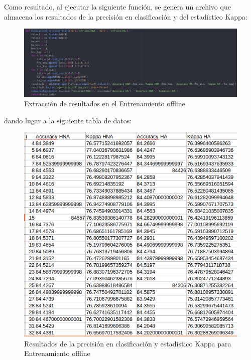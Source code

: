 Como resultado, al ejecutar la siguiente función, se genera un archivo que almacena los resultados de la precisión en clasificación y del estadístico Kappa:

\begin{figure}[H] %
	\centering
	\includegraphics[scale=0.4]{off-ev.png}  %
	\caption{Extracción de resultados en el Entrenamiento offline} 
	\label{fig:off2}
\end{figure}

dando lugar a la siguiente tabla de datos:
\begin{figure}[H] %
	\centering
	\includegraphics[scale=0.45]{ejercicio-offline.png}  %
	\caption{Resultados de la precisión en clasificación y estadístico Kappa para Entrenamiento offline} 
	\label{fig:off3}
\end{figure}

